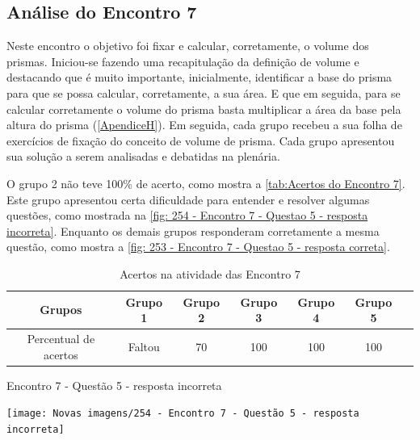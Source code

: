 \subsection{Análise do Encontro 7}

Neste encontro o objetivo foi fixar e calcular, corretamente, o volume dos prismas. Iniciou-se fazendo uma recapitulação da definição de volume e destacando que é muito importante, inicialmente, identificar a base do prisma para que se possa calcular, corretamente, a sua área. E que em seguida, para se calcular corretamente o volume do prisma basta multiplicar a área da base pela altura do prisma (\autoref{ApendiceH}). Em seguida, cada grupo recebeu a sua folha de exercícios de fixação do conceito de volume de prisma. Cada grupo apresentou sua solução a serem analisadas e debatidas na plenária.


O grupo 2 não teve 100\% de acerto, como mostra a \autoref{tab:Acertos do Encontro 7}. Este grupo apresentou certa dificuldade para entender e resolver algumas questões, como mostrada na \autoref{fig: 254 - Encontro 7 - Questao 5 - resposta incorreta}. Enquanto os demais grupos responderam corretamente a mesma questão, como mostra a \autoref{fig: 253 - Encontro 7 - Questao 5 - resposta correta}.

\begin{table}[htbp] \centering
    \caption{Acertos na atividade das Encontro 7} \label{tab:Acertos do Encontro 7}
    \begin{tabular}{|c|c|c|c|c|c|c|}
        \hline
        \textbf{Grupos}       & \textbf{Grupo 1} & \textbf{Grupo 2} & \textbf{Grupo 3} & \textbf{Grupo 4} & \textbf{Grupo 5} \\
        \hline
        Percentual de acertos & Faltou           & 70               & 100              & 100              & 100              \\
        \hline
    \end{tabular}
    \legend{\legendaTabela}
\end{table}

\begin{CenteredFigure}
    \caption{Encontro 7 - Questão 5 - resposta incorreta} \label{fig: 254 - Encontro 7 - Questao 5 - resposta incorreta}
    \texttt{[image: Novas imagens/254 - Encontro 7 - Questão 5 - resposta incorreta]}
    \legend{\autoria}
\end{CenteredFigure}

